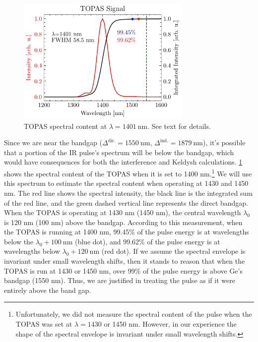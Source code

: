 \begin{figure}
	\centering
	\includegraphics[width=0.75\textwidth]{figures/chap4/TOPAS_1400nm_spectral_inten.pdf}
	\caption{TOPAS spectral content at $\lambda = 1401 \ \textrm{nm}$. See text for details.}
	\label{fig:TOPAS_1400nm_spectral_inten}
\end{figure}

Since we are near the bandgap ($\Delta^{\textrm{dir.}} = 1550 \ \textrm{nm}$, $\Delta^{\textrm{ind.}} = 1879 \ \textrm{nm}$), it's possible that a portion of the IR pulse's spectrum will be below the bandgap, which would have consequences for both the interference and Keldysh calculations. \cref{fig:TOPAS_1400nm_spectral_inten} shows the spectral content of the TOPAS when it is set to 1400 nm.\footnote{Unfortunately, we did not measure the spectral content of the pulse when the TOPAS was set at $\lambda = 1430$ or 1450 nm. However, in our experience the shape of the spectral envelope is invariant under small wavelength shifts.} We will use this spectrum to estimate the spectral content when operating at 1430 and 1450 nm. The red line shows the spectral intensity, the black line is the integrated sum of the red line, and the green dashed vertical line represents the direct bandgap. When the TOPAS is operating at 1430 nm (1450 nm), the central wavelength $\lambda_0$ is 120 nm (100 nm) above the bandgap. According to this measurement, when the TOPAS is running at 1400 nm, 99.45\% of the pulse energy is at wavelengths below the $\lambda_0 + 100 \ \textrm{nm}$ (blue dot), and 99.62\% of the pulse energy is at wavelengths below $\lambda_0 + 120 \ \textrm{nm}$ (red dot). If we assume the spectral envelope is invariant under small wavelength shifts, then it stands to reason that when the TOPAS is run at 1430 or 1450 nm, over 99\% of the pulse energy is above Ge's bandgap (1550 nm). Thus, we are justified in treating the pulse as if it were entirely above the band gap.

